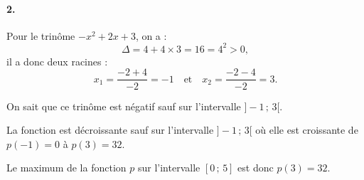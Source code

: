 \documentclass[10pt]{article}
\begin{document}
\paragraph{2.} Pour le trinôme \( -x^2 + 2x + 3 \), on a :
\[
\Delta = 4 + 4 \times 3 = 16 = 4^2 > 0,
\]
il a donc deux racines :
\[
x_1 = \dfrac{-2 + 4}{-2} = -1 \quad \text{et} \quad x_2 = \dfrac{-2 - 4}{-2} = 3.
\]

On sait que ce trinôme est négatif sauf sur l'intervalle \( ]-1 \,;\, 3[ \).

La fonction est décroissante sauf sur l'intervalle \( ]-1 \,;\, 3[ \) où elle est croissante de \( p(-1) = 0 \) à \( p(3) = 32 \).

Le maximum de la fonction \( p \) sur l'intervalle \( [0 \,;\, 5] \) est donc \( p(3) = 32 \).
\end{document}
